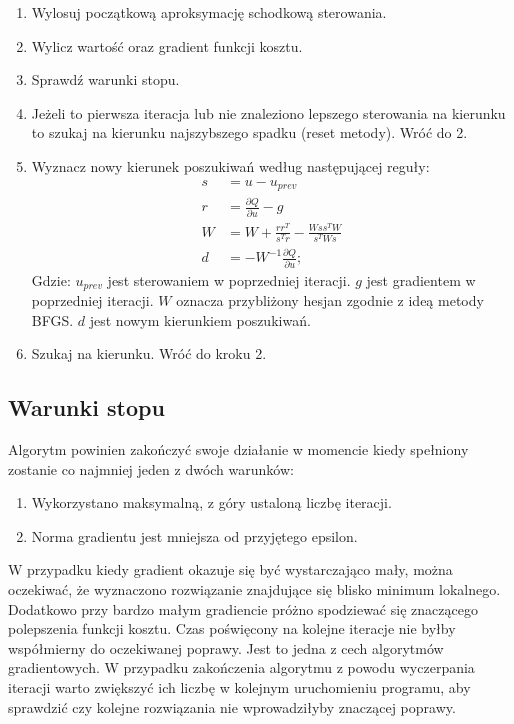 \begin{enumerate}
\item Wylosuj początkową aproksymację schodkową sterowania.
\item Wylicz wartość oraz gradient funkcji kosztu.
\item Sprawdź warunki stopu.
\item Jeżeli to pierwsza iteracja lub nie znaleziono lepszego sterowania na kierunku to szukaj na kierunku najszybszego spadku (reset metody). Wróć do 2.
\item Wyznacz nowy kierunek poszukiwań według następującej reguły:
\begin{equation}
\begin{aligned}
s &= u - u_{prev}\\
r &= \frac{\partial Q}{\partial u} - g\\
W &= W + \frac{rr^T}{s^Tr} - \frac{Wss^TW}{s^TWs}\\
d &= -W^{-1}\frac{\partial Q}{\partial u};
\end{aligned}
\end{equation}
\noindent Gdzie:\newline
\(u_{prev}\) jest sterowaniem w poprzedniej iteracji.\newline
\(g\) jest gradientem w poprzedniej iteracji.\newline
\(W\) oznacza przybliżony hesjan zgodnie z ideą metody BFGS.\newline
\(d\) jest nowym kierunkiem poszukiwań.
\item Szukaj na kierunku. Wróć do kroku 2.
\end{enumerate}

\subsection{Warunki stopu}
Algorytm powinien zakończyć swoje działanie w momencie kiedy spełniony zostanie co najmniej jeden z dwóch warunków: 
\begin{enumerate}
\item Wykorzystano maksymalną, z góry ustaloną liczbę iteracji.
\item Norma gradientu jest mniejsza od przyjętego epsilon.
\end{enumerate}
W przypadku kiedy gradient okazuje się być wystarczająco mały, można oczekiwać, że wyznaczono rozwiązanie znajdujące się blisko minimum lokalnego. Dodatkowo przy bardzo małym gradiencie próżno spodziewać się znaczącego polepszenia funkcji kosztu. Czas poświęcony na kolejne iteracje nie byłby współmierny do oczekiwanej poprawy. Jest to jedna z cech algorytmów gradientowych. W przypadku zakończenia algorytmu z powodu wyczerpania iteracji warto zwiększyć ich liczbę w kolejnym uruchomieniu programu, aby sprawdzić czy kolejne rozwiązania nie wprowadziłyby znaczącej poprawy.

